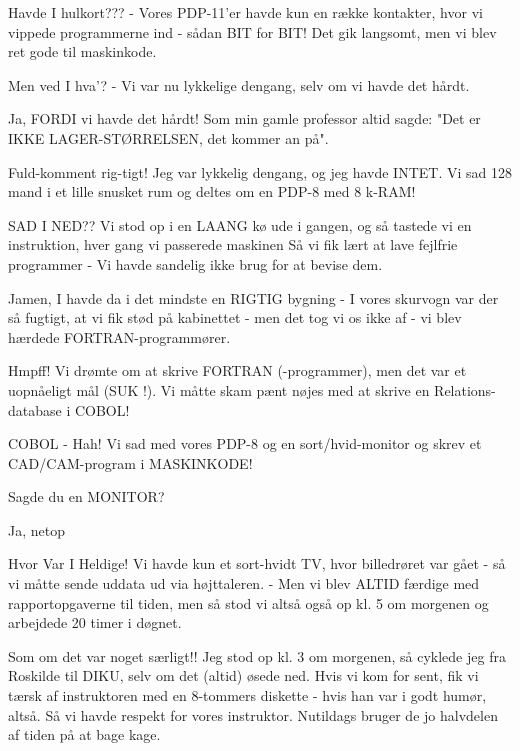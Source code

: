 \documentclass[a4paper,11pt]{article}
\begin{document}
\begin{sketch}
 Havde I hulkort??? - Vores PDP-11'er havde kun en række kontakter, hvor vi vippede programmerne ind 
         - sådan BIT for BIT! Det gik langsomt, men vi blev ret gode til maskinkode.

 Men ved I hva'? - Vi var nu lykkelige dengang, selv om vi havde det hårdt.

 Ja, FORDI vi havde det hårdt! Som min gamle professor altid sagde: "Det er IKKE LAGER-STØRRELSEN, det kommer an på".


 Fuld-komment rig-tigt! Jeg var lykkelig dengang, og jeg havde INTET. Vi sad 128 mand i et lille snusket rum og
         deltes om en PDP-8 med 8 k-RAM!


 SAD I NED?? Vi stod op i en LAANG kø ude i gangen, og så tastede vi en instruktion, hver gang vi passerede maskinen 
         Så vi fik lært at lave fejlfrie programmer -  Vi havde sandelig ikke brug for at bevise dem.

 Jamen, I havde da i det mindste en RIGTIG bygning - I vores skurvogn var der så fugtigt, at vi fik stød på kabinettet - men det tog vi os
         ikke af - vi blev hærdede FORTRAN-programmører.

  Hmpff! Vi drømte om at skrive FORTRAN (-programmer), men det var et uopnåeligt mål (SUK !). Vi måtte skam pænt nøjes med
         at skrive en Relations-database i COBOL!

  COBOL - Hah! Vi sad med vores PDP-8 og en sort/hvid-monitor og skrev et CAD/CAM-program i MASKINKODE!

  Sagde du en MONITOR?

 Ja, netop

 Hvor Var I Heldige! Vi havde kun et sort-hvidt TV, hvor billedrøret var gået  - så vi måtte sende uddata ud via højttaleren.
          - Men vi blev ALTID færdige med rapportopgaverne til tiden, men så stod vi altså også op kl. 5 om morgenen og arbejdede 20 timer i døgnet.

 Som om det var noget særligt!! Jeg stod op kl. 3 om morgenen, så cyklede jeg fra Roskilde til DIKU, selv om det (altid) øsede ned.
         Hvis vi kom for sent, fik vi tærsk af instruktoren med en 8-tommers diskette  - hvis han var i godt humør, altså.
         Så vi havde respekt for vores instruktor. Nutildags bruger de jo halvdelen af tiden på at bage kage.


\end{sketch}
\end{document}
